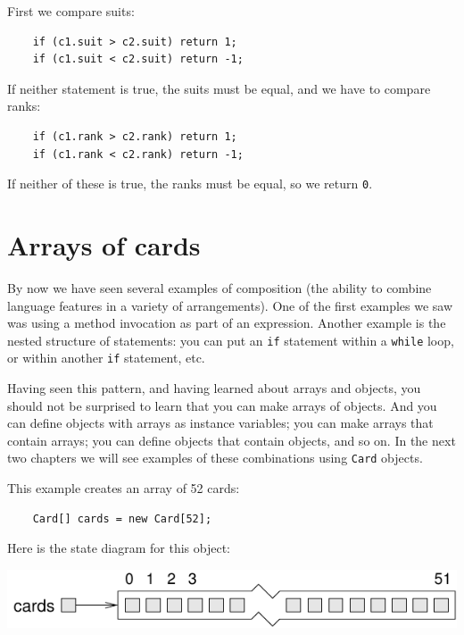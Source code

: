 \documentclass[12pt]{book}
\theoremstyle{exercise}
\begin{document}
First we compare suits:

\begin{lstlisting}
    if (c1.suit > c2.suit) return 1;
    if (c1.suit < c2.suit) return -1;
\end{lstlisting}
%
If neither statement is true, the suits must be equal,
and we have to compare ranks:

\begin{lstlisting}
    if (c1.rank > c2.rank) return 1;
    if (c1.rank < c2.rank) return -1;
\end{lstlisting}
%
If neither of these is true, the ranks must be equal,
so we return {\tt 0}.


\section{Arrays of cards}
\label{cardarray}

By now we have seen several examples of composition (the ability to
combine language features in a variety of arrangements).  One of the
first examples we saw was using a method invocation as part of an
expression.  Another example is the nested structure of statements:
you can put an {\tt if} statement within a {\tt while} loop, or within
another {\tt if} statement, etc.

Having seen this pattern, and having learned about arrays and objects,
you should not be surprised to learn that you can make arrays of
objects.  And you can define objects with arrays as
instance variables; you can make arrays that contain arrays; you can
define objects that contain objects, and so on.
In the next two chapters we will see examples of these
combinations using {\tt Card} objects.

This example creates an array of 52 cards:

\begin{lstlisting}
    Card[] cards = new Card[52];
\end{lstlisting}

Here is the state diagram for this object:


\includegraphics{figs/cardarray.pdf}
\end{document}
